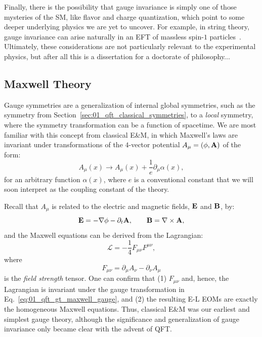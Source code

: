 Finally, there is the possibility that gauge invariance is simply one of those mysteries of the SM, like flavor and charge quantization, which point to some deeper underlying physics we are yet to uncover.
For example, in string theory, gauge invariance can arise naturally in an EFT of massless spin-$1$ particles~\cite{Green:1987sp}.
Ultimately, these considerations are not particularly relevant to the experimental physics, but after all this is a dissertation for a doctorate of philosophy...
 

\subsection{Maxwell Theory}
\label{sec:01_qft_gt_maxwell}

Gauge symmetries are a generalization of internal global symmetries, such as the \UU[1] symmetry from Section~\ref{sec:01_qft_classical_symmetries}, to a \textit{local} symmetry, where the symmetry transformation can be a function of spacetime.
We are most familiar with this concept from classical E\&M, in which Maxwell's laws are invariant under transformations of the $4$-vector potential $A_\mu = (\phi, \mathbf{A})$ of the form:
\begin{equation}
	\label{eq:01_qft_gt_maxwell_gauge}
	A_\mu(x) \rightarrow A_\mu(x) + \frac{1}{e}\partial_\mu\alpha(x),
\end{equation}
for an arbitrary function $\alpha(x)$, where $e$ is a conventional constant that we will soon interpret as the coupling constant of the theory.

Recall that $A_\mu$ is related to the electric and magnetic fields, $\mathbf{E}$ and $\mathbf{B}$, by:
\begin{equation}
	\label{eq:01_qft_gt_maxwell_fields}
	\mathbf{E} = -\nabla\phi - \partial_t\mathbf{A}, \qquad \mathbf{B} = \nabla\times\mathbf{A},
\end{equation}
and the Maxwell equations can be derived from the Lagrangian:
\begin{equation}
	\label{eq:01_qft_gt_maxwell_lagrangian}
	\mathcal L = -\frac{1}{4}F_{\mu\nu}F^{\mu\nu},
\end{equation}
where
\begin{equation}
	\label{eq:01_qft_gt_maxwell_field_strength}
	F_{\mu\nu} = \partial_\mu A_\nu - \partial_\nu A_\mu
\end{equation}
is the \textit{field strength} tensor.
One can confirm that (1) $F_{\mu\nu}$ and, hence, the Lagrangian is invariant under the gauge transformation in Eq.~\ref{eq:01_qft_gt_maxwell_gauge}, and (2) the resulting E-L EOMs are exactly the homogeneous Maxwell equations.
Thus, classical E\&M was our earliest and simplest gauge theory, although the significance and generalization of gauge invariance only became clear with the advent of QFT.

